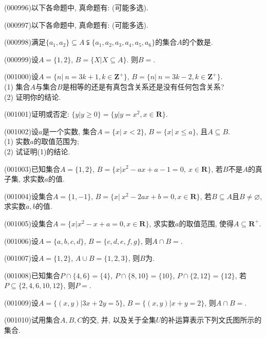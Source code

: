 \item (000996)以下各命题中, 真命题有: (可能多选).
\fourch{$\varnothing \in \varnothing$}{$\varnothing \in \{\varnothing\}$}{$\varnothing \subseteq \varnothing$}{$\varnothing \subseteq \{\varnothing\}$}
\item (000997)以下各命题中, 真命题有: (可能多选).
\item (000998)满足$\{a_1,a_2\}\subseteq A\subsetneqq\{a_1,a_2,a_3,a_4,a_5,a_6\}$的集合$A$的个数是.
\item (000999)设$A=\{1,2\}$, $B=\{X|X\subseteq A\}$. 则$B=$.
\item (001000)设$A=\{n|\ n=3k+1,k \in \mathbf{Z}^+\}$, $B=\{n|\ n=3k-2,k \in \mathbf{Z}^+\}$.\\ 
(1) 集合$A$与集合$B$是相等的还是有真包含关系还是没有任何包含关系?\\ 
(2) 证明你的结论.
\item (001001)证明或否定: $\{y|y\ge 0\}=\{y|y=x^2, x \in \mathbf{R}\}$.
\item (001002)设$a$是一个实数, 集合$A=\{x|\ x<2\}$, $B=\{x|\ x\leq a\}$, 且$A \subseteq B$.\\ 
(1) 实数$a$的取值范围为;\\ 
(2) 试证明(1)的结论.
\item (001003)已知集合$A=\{1,2\}$, $B=\{x|x^2-ax+a-1=0,\ x\in\mathbf{R}\}$, 若$B$不是$A$的真子集, 求实数$a$的值.
\item (001004)设集合$A=\{1,-1\}$, $B=\{x|\ x^2-2ax+b=0,x\in\mathbf{R}\}$, 若$B\subseteq A$且$B\neq\varnothing$, 求实数$a,b$的值.
\item (001005)设集合$A=\{x|x^2-x+a=0, x \in \mathbf{R}\}$, 求实数$a$的取值范围, 使得$A \subseteq \mathbf{R}^+$.
\item (001006)设$A=\{a,b,c,d\}$, $B=\{c,d,e,f,g\}$, 则$A \cap B=$.
\item (001007)设$A=\{1,2\}$, $A\cup B=\{1,2,3\}$, 则$B$为.
\item (001008)已知集合$P\cap\{4,6\}=\{4\}$, $P\cap\{8,10\}=\{10\}$, $P\cap\{2,12\}=\{12\}$,
若$P\subseteq\{2,4,6,10,12\}$, 则$P=$.
\item (001009)设$A=\{(x,y)|3x+2y=5\}$, $B=\{(x,y)|x+y=2\}$, 则$A\cap B=$.
\item (001010)试用集合$A,B,C$的交, 并, 以及关于全集$U$的补运算表示下列文氏图所示的集合.
